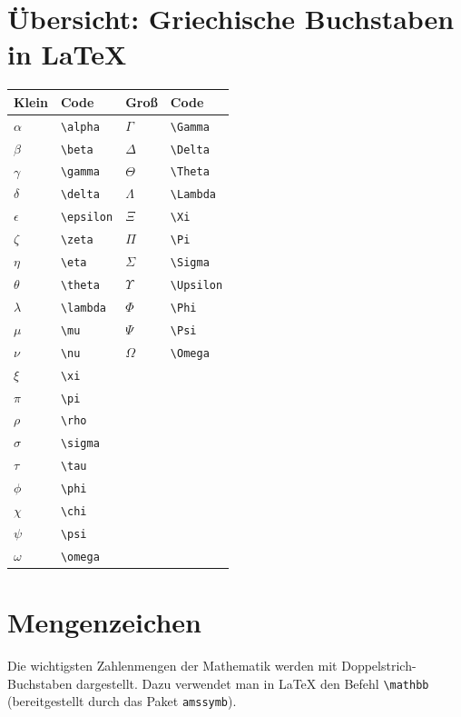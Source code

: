\documentclass[twoside]{scrreprt}
\begin{document}
\section{Übersicht: Griechische Buchstaben in \LaTeX}

\begin{center}
\begin{tabular}{ll|ll}
\textbf{Klein} & \textbf{Code} & \textbf{Groß} & \textbf{Code} \\
\hline
$\alpha$ & \verb|\alpha| & $\Gamma$ & \verb|\Gamma| \\
$\beta$ & \verb|\beta| & $\Delta$ & \verb|\Delta| \\
$\gamma$ & \verb|\gamma| & $\Theta$ & \verb|\Theta| \\
$\delta$ & \verb|\delta| & $\Lambda$ & \verb|\Lambda| \\
$\epsilon$ & \verb|\epsilon| & $\Xi$ & \verb|\Xi| \\
$\zeta$ & \verb|\zeta| & $\Pi$ & \verb|\Pi| \\
$\eta$ & \verb|\eta| & $\Sigma$ & \verb|\Sigma| \\
$\theta$ & \verb|\theta| & $\Upsilon$ & \verb|\Upsilon| \\
$\lambda$ & \verb|\lambda| & $\Phi$ & \verb|\Phi| \\
$\mu$ & \verb|\mu| & $\Psi$ & \verb|\Psi| \\
$\nu$ & \verb|\nu| & $\Omega$ & \verb|\Omega| \\
$\xi$ & \verb|\xi| & & \\
$\pi$ & \verb|\pi| & & \\
$\rho$ & \verb|\rho| & & \\
$\sigma$ & \verb|\sigma| & & \\
$\tau$ & \verb|\tau| & & \\
$\phi$ & \verb|\phi| & & \\
$\chi$ & \verb|\chi| & & \\
$\psi$ & \verb|\psi| & & \\
$\omega$ & \verb|\omega| & & \\
\end{tabular}
\end{center}

\section{Mengenzeichen}

Die wichtigsten Zahlenmengen der Mathematik werden mit Doppelstrich-Buchstaben dargestellt.  
Dazu verwendet man in \LaTeX{} den Befehl \verb|\mathbb|{} (bereitgestellt durch das Paket \texttt{amssymb}).
\end{document}
